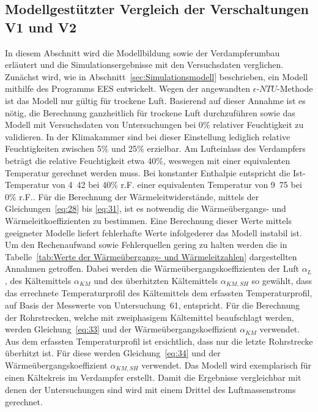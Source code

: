 \subsection{Modellgestützter Vergleich der Verschaltungen V1 und V2}
\label{subsec:Modellgestützter Vergleich der Verschaltungen V1 und V2}

In diesem Abschnitt wird die Modellbildung sowie der Verdampferumbau erläutert und die Simulationsergebnisse mit den Versuchsdaten verglichen.
Zunächst wird, wie in Abschnitt~\ref{sec:Simulationsmodell} beschrieben, ein Modell mithilfe des Programms EES entwickelt. Wegen der angewandten $\epsilon$-$NTU$-Methode ist das Modell nur gültig für trockene Luft\cite{Bergman.2011}. Basierend auf dieser Annahme ist es nötig, die Berechnung ganzheitlich für trockene Luft durchzuführen sowie das Modell mit Versuchsdaten von Untersuchungen bei \unit{0}{\%} relativer Feuchtigkeit zu validieren. In der Klimakammer sind bei dieser Einstellung lediglich relative Feuchtigkeiten zwischen \unit{5}{\%} und \unit{25}{\%} erzielbar. Am Lufteinlass des Verdampfers beträgt die relative Feuchtigkeit etwa \unit{40}{\%}, weswegen mit einer equivalenten Temperatur gerechnet werden muss. Bei konstanter Enthalpie entspricht die Ist-Temperatur von \unit{4.42}{\celsius} bei \unit{40}{\%} r.F. einer equivalenten Temperatur von \unit{9.75}{\celsius} bei \unit{0}{\%} r.F.. \newline
Für die Berechnung der Wärmeleitwiderstände, mittels der Gleichungen~\ref{eq:28} bis \ref{eq:31}, ist es notwendig die Wärmeübergangs- und Wärmeleitkoeffizienten zu bestimmen. Eine Berechnung dieser Werte mittels geeigneter Modelle liefert fehlerhafte Werte infolgederer das Modell instabil ist. Um den Rechenaufwand sowie Fehlerquellen gering zu halten werden die in Tabelle~\ref{tab:Werte der Wärmeübergangs- und Wärmeleitzahlen} dargestellten Annahmen getroffen\cite{Bergman.2011}\cite{Recknagel.2005}\cite{DINDeutschesInstitutfurNormunge.V..2017d}. Dabei werden die Wärmeübergangskoeffizienten der Luft $\alpha_L$, des Kältemittels $\alpha_{KM}$ und des überhitzten Kältemittels $\alpha_{KM,SH}$ so gewählt, dass das errechnete Temperaturprofil des Kältemittels dem erfassten Temperaturprofil, auf Basis der Messwerte von Untersuchung~61, entspricht. 
Für die Berechnung der Rohrstrecken, welche mit zweiphasigem Kältemittel beaufschlagt werden, werden Gleichung~\ref{eq:33} und der Wärmeübergangskoeffizient $\alpha_{KM}$ verwendet. Aus dem erfassten Temperaturprofil ist ersichtlich, dass nur die letzte Rohrstrecke überhitzt ist. Für diese werden Gleichung~\ref{eq:34} und der Wärmeübergangskoeffizient $\alpha_{KM,SH}$ verwendet. \newline
Das Modell wird exemplarisch für einen Kältekreis im Verdampfer erstellt. Damit die Ergebnisse vergleichbar mit denen der Untersuchungen sind wird mit einem Drittel des Luftmassenstroms gerechnet. 

